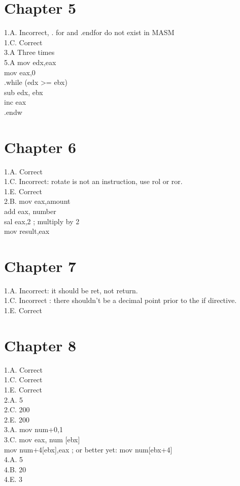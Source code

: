 \documentclass[10pt]{article}
\begin{document}
\section*{Chapter 5}
1.A. Incorrect, . for and .endfor do not exist in MASM\\
1.C. Correct\\
3.A Three times\\
5.A mov edx,eax\\
mov eax,0\\
.while (edx >= ebx)\\
sub edx, ebx\\
inc eax\\
.endw

\section*{Chapter 6}
1.A. Correct\\
1.C. Incorrect: rotate is not an instruction, use rol or ror.\\
1.E. Correct\\
2.B. mov eax,amount\\
add eax, number\\
sal eax,2 ; multiply by 2\\
mov result,eax

\section*{Chapter 7}
1.A. Incorrect: it should be ret, not return.\\
1.C. Incorrect : there shouldn't be a decimal point prior to the if directive.\\
1.E. Correct

\section*{Chapter 8}
1.A. Correct\\
1.C. Correct\\
1.E. Correct\\
2.A. 5\\
2.C. 200\\
2.E. 200\\
3.A. mov num+0,1\\[0pt]
3.C. mov eax, num [ebx]\\[0pt]
mov num+4[ebx],eax ; or better yet: mov num[ebx+4]\\
4.A. 5\\
4.B. 20\\
4.E. 3
\end{document}

